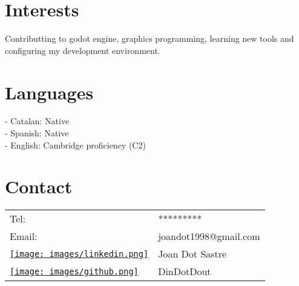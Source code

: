 \documentclass[9pt,oneside,a4paper,titlepage]{article}
\begin{document}
\begin{tcolorbox}
\begin{minipage}[t]{8cm}
\begin{tcolorbox}[grow to left by=0.6cm,colback=gray!25,colframe=white,height fill]
			\section*{Interests}
			Contributting to godot engine, graphics programming, learning new tools and configuring
			my development environment.
			\section*{Languages}
			- Catalan: Native \\
			- Spanish: Native \\
			- English: Cambridge proficiency (C2)
			\section*{Contact}
			\begin{tabular}{l l}
				Tel:                                                                                                                      & ********* \\
				Email:                                                                                                                    & joandot1998@gmail.com \\
				\href{https://www.linkedin.com/in/joan-dot-sastre-50860a198/}{\protect\texttt{[image: images/linkedin.png]}} & Joan Dot Sastre       \\
				\href{https://github.com/DinDotDout}{\protect\texttt{[image: images/github.png]}}                            & DinDotDout            \\
			\end{tabular}
		\end{tcolorbox}
	\end{minipage}
	\begin{minipage}[t]{11cm}
		\vspace*{-0.5cm}
		\begin{tcolorbox}[grow to right by=0.75cm, colframe=white,colback=white]

\end{tcolorbox}
\end{minipage}
\end{tcolorbox}
\end{document}
